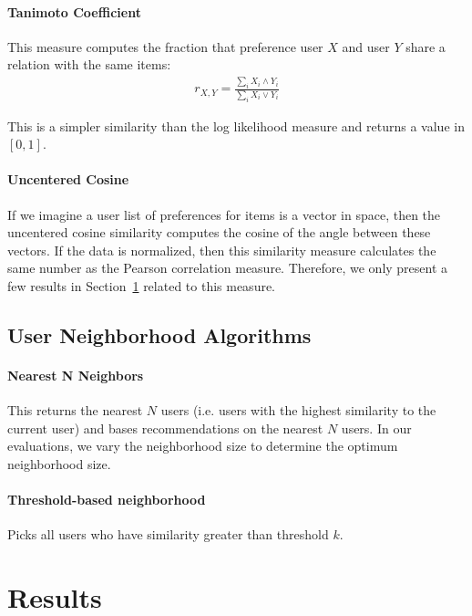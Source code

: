 \documentclass{article}
\begin{document}
\paragraph{Tanimoto Coefficient}

This measure computes the
fraction that preference user $X$ and user $Y$ share a relation with the same items:\begin{align*}
r_{X, Y} = \frac{\sum_i X_i \wedge Y_i}{\sum_i X_i \vee Y_i}
\end{align*}

This is a simpler similarity than the log likelihood measure and returns a value in $[0, 1]$. 

\paragraph{Uncentered Cosine}

If we imagine a user list of preferences for items is a vector in space, then the uncentered cosine similarity computes
the cosine of the angle between these vectors. If the data is normalized, then this similarity measure calculates the
same number as the Pearson correlation measure. Therefore, we only present a few results in Section~\ref{sec:results} related to this measure.

\subsection{User Neighborhood Algorithms}

\paragraph{Nearest N Neighbors} This returns the nearest $N$ users (i.e. users with the highest similarity to the current
user) and bases recommendations on the nearest $N$ users. In our evaluations, we vary the neighborhood size to 
determine the optimum neighborhood size. 

\paragraph{Threshold-based neighborhood} Picks all users who have similarity greater than threshold $k$. 

\section{Results}\label{sec:results}
\end{document}
